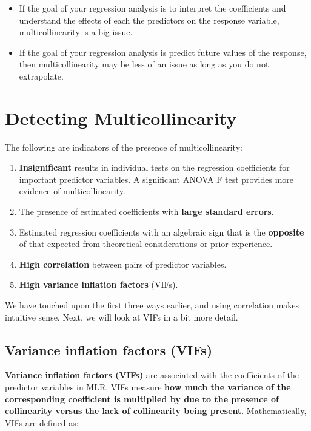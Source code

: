 \documentclass[
]{book}
\providecommand{\tightlist}{%
  \setlength{\itemsep}{0pt}\setlength{\parskip}{0pt}}
\begin{document}
\begin{itemize}
\tightlist
\item
  If the goal of your regression analysis is to interpret the coefficients and understand the effects of each the predictors on the response variable, multicollinearity is a big issue.
\item
  If the goal of your regression analysis is predict future values of the response, then multicollinearity may be less of an issue as long as you do not extrapolate.
\end{itemize}

\hypertarget{detecting-multicollinearity}{%
\section{Detecting Multicollinearity}\label{detecting-multicollinearity}}

The following are indicators of the presence of multicollinearity:

\begin{enumerate}
\def\labelenumi{\arabic{enumi}.}
\item
  \textbf{Insignificant} results in individual tests on the regression
  coefficients for important predictor variables. A significant ANOVA F test provides more evidence of multicollinearity.
\item
  The presence of estimated coefficients with \textbf{large standard errors}.
\item
  Estimated regression coefficients with an algebraic sign
  that is the \textbf{opposite} of that expected from theoretical
  considerations or prior experience.
\item
  \textbf{High correlation} between pairs of
  predictor variables.
\item
  \textbf{High variance inflation factors} (VIFs).
\end{enumerate}

We have touched upon the first three ways earlier, and using correlation makes intuitive sense. Next, we will look at VIFs in a bit more detail.

\hypertarget{variance-inflation-factors-vifs}{%
\subsection{Variance inflation factors (VIFs)}\label{variance-inflation-factors-vifs}}

\textbf{Variance inflation factors (VIFs)} are associated with the coefficients of the predictor variables in MLR. VIFs measure \textbf{how much the variance of the corresponding coefficient is multiplied by due to the presence of collinearity versus the lack of collinearity being present}. Mathematically, VIFs are defined as:
\end{document}
